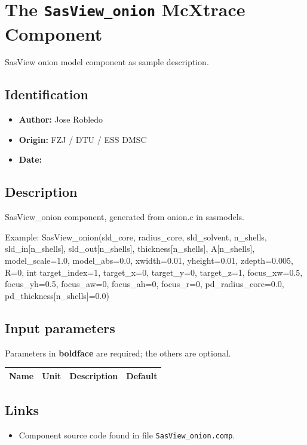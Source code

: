 \section{The \texttt{SasView\_onion} McXtrace Component}
SasView onion model component as sample description.

\subsection*{Identification}
\begin{itemize}
  \item \textbf{Author:} Jose Robledo
  \item \textbf{Origin:} FZJ / DTU / ESS DMSC
  \item \textbf{Date:} 
\end{itemize}

\subsection*{Description}
SasView\_onion component, generated from onion.c in sasmodels.

Example: SasView\_onion(sld\_core, radius\_core, sld\_solvent, n\_shells, sld\_in[n\_shells], sld\_out[n\_shells], thickness[n\_shells], A[n\_shells], model\_scale=1.0, model\_abs=0.0, xwidth=0.01, yheight=0.01, zdepth=0.005, R=0, int target\_index=1, target\_x=0, target\_y=0, target\_z=1, focus\_xw=0.5, focus\_yh=0.5, focus\_aw=0, focus\_ah=0, focus\_r=0, pd\_radius\_core=0.0, pd\_thickness[n\_shells]=0.0)

\subsection*{Input parameters}
Parameters in \textbf{boldface} are required; the others are optional.

\begin{longtable}{p{}p{}p{}p{}}
\toprule
\textbf{Name} & \textbf{Unit} & \textbf{Description} & \textbf{Default} \\
\midrule
\endhead
\bottomrule
\end{longtable}

\subsection*{Links}
\begin{itemize}
  \item Component source code found in file \texttt{SasView\_onion.comp}.
\end{itemize}
